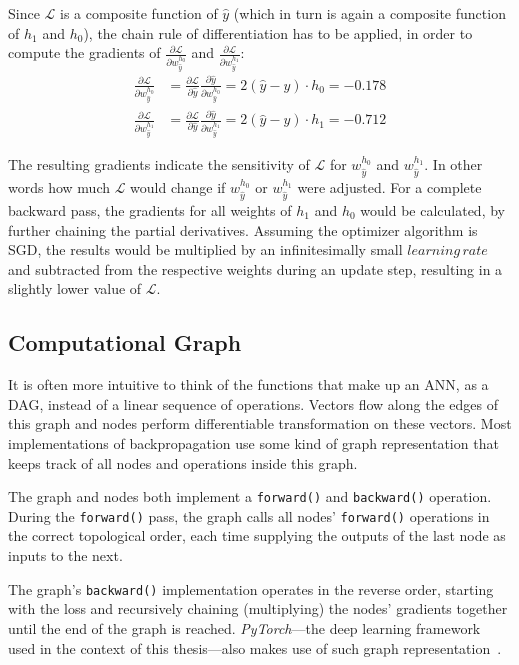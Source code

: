 Since $\mathcal{L}$ is a composite function of $\hat{y}$ (which in turn is again a composite function of $h_1$ and $h_0$), the chain rule of differentiation has to be applied, in order to compute the gradients of $\frac{\partial \mathcal{L}}{\partial w_{\hat{y}}^{h_0}}$ and $\frac{\partial \mathcal{L}}{\partial w_{\hat{y}}^{h_1}}$:
\begin{align}
\frac{\partial \mathcal{L}}{\partial w_{\hat{y}}^{h_0}} &= \frac{\partial \mathcal{L}}{\partial \hat{y}}\frac{\partial \hat{y}}{\partial w_{\hat{y}}^{h_0}} = 2(\hat{y}-y) \cdot h_0 = -0.178\\
\frac{\partial \mathcal{L}}{\partial w_{\hat{y}}^{h_1}} &= \frac{\partial \mathcal{L}}{\partial \hat{y}}\frac{\partial \hat{y}}{\partial w_{\hat{y}}^{h_1}} = 2(\hat{y}-y) \cdot h_1 = -0.712
\end{align}

The resulting gradients indicate the sensitivity of $\mathcal{L}$ for $w_{\hat{y}}^{h_0}$ and $w_{\hat{y}}^{h_1}$.
In other words how much $\mathcal{L}$ would change if $w_{\hat{y}}^{h_0}$ or $w_{\hat{y}}^{h_1}$ were adjusted. For a complete backward pass, the gradients for all weights of $h_1$ and $h_0$ would be calculated, by further chaining the partial derivatives. Assuming the optimizer algorithm is \ac{SGD}, the results would be multiplied by an infinitesimally small $learning\,rate$ and subtracted from the respective weights during an update step, resulting in a slightly lower value of $\mathcal{L}$.

\subsection{Computational Graph}
It is often more intuitive to think of the functions that make up an \ac{ANN}, as a \ac{DAG}, instead of a linear sequence of operations. Vectors flow along the edges of this graph and nodes perform differentiable transformation on these vectors. Most implementations of backpropagation use some kind of graph representation that keeps track of all nodes and operations inside this graph.

The graph and nodes both implement a \texttt{forward()} and \texttt{backward()} operation. 
During the \texttt{forward()} pass, the graph calls all nodes' \texttt{forward()} operations in the correct topological order, each time supplying the outputs of the last node as inputs to the next.

The graph's \texttt{backward()} implementation operates in the reverse order, starting with the loss and recursively chaining (multiplying) the nodes' gradients together until the end of the graph is reached.
\textit{PyTorch}---the deep learning framework used in the context of this thesis---also makes use of such graph representation~\parencite{paszke2019pytorch}.
